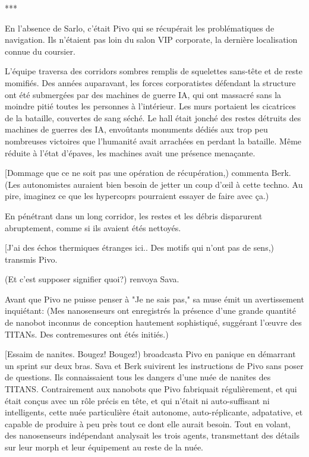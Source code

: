\begin{center} *** \end{center} 

En l'absence de Sarlo, c'était Pivo qui se récupérait les problématiques de navigation. Ils n'étaient pas loin du salon VIP corporate, la dernière localisation connue du coursier. 

L'équipe traversa des corridors sombres remplis de squelettes sans-tête et de reste momifiés. Des années auparavant, les forces corporatistes défendant la structure ont été submergées par des machines de guerre IA, qui ont massacré sans la moindre pitié toutes les personnes à l'intérieur. Les murs portaient les cicatrices de la bataille, couvertes de sang séché. Le hall était jonché des restes détruits des machines de guerres des IA, envoûtants monuments dédiés aux trop peu nombreuses victoires que l'humanité avait arrachées en perdant la bataille. Même réduite à l'état d'épaves, les machines avait une présence menaçante. 

[Dommage que ce ne soit pas une opération de récupération,) commenta Berk. (Les autonomistes auraient bien besoin de jetter un coup d'œil à cette techno. Au pire, imaginez ce que les hypercoprs pourraient essayer de faire avec ça.) 

En pénétrant dans un long corridor, les restes et les débris disparurent abruptement, comme si ils avaient étés nettoyés. 

[J'ai des échos thermiques étranges ici.. Des motifs qui n'ont pas de sens,) transmis Pivo. 

(Et c'est supposer signifier quoi?) renvoya Sava. 

Avant que Pivo ne puisse penser à "Je ne sais pas," sa muse émit un avertissement inquiétant: (Mes nanosenseurs ont enregistrés la présence d'une grande quantité de nanobot inconnus de conception hautement sophistiqué, suggérant l'œuvre des TITANs. Des contremesures ont étés initiés.) 

[Essaim de nanites. Bougez! Bougez!) broadcasta Pivo en panique en démarrant un sprint sur deux bras. Sava et Berk suivirent les instructions de Pivo sans poser de questions. Ils connaissaient tous les dangers d'une nuée de nanites des TITANS. Contrairement aux nanobots que Pivo fabriquait régulièrement, et qui était conçus avec un rôle précis en tête, et qui n'était ni auto-suffisant ni intelligents, cette nuée particulière était autonome, auto-réplicante, adpatative, et capable de produire à peu près tout ce dont elle aurait besoin. Tout en volant, des nanosenseurs indépendant analysait les trois agents, transmettant des détails sur leur morph et leur équipement au reste de la nuée. 

